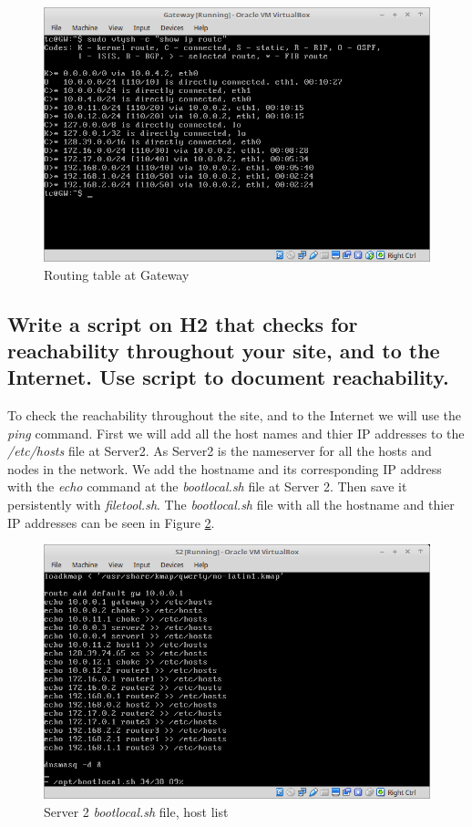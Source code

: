 \documentclass{article}
\begin{document}
\begin{figure}[!h]
    \centering
    \includegraphics[scale=0.3]{gateway-vytsh-route}
    \caption{Routing table at Gateway}
    \label{fig:GW-routes}
\end{figure}



\subsection{Write a script on H2 that checks for reachability throughout your site, and to the Internet. Use script to document reachability.}

To check the reachability throughout the site, and to the Internet we will use the \textit{ping} command. First we will add all the host names and thier IP addresses to the \textit{/etc/hosts} file at Server2. As Server2 is the nameserver for all the hosts and nodes in the network. 
We add the hostname and its corresponding IP address with the \textit{echo} command at the \textit{bootlocal.sh} file at Server 2. Then save it persistently with \textit{filetool.sh}. The \textit{bootlocal.sh} file with all the hostname and thier IP addresses can be seen in Figure \ref{fig:server2-lst}. 

\begin{figure}[!h]
    \centering
    \includegraphics[scale=0.3]{server2-host-list}
    \caption{Server 2 \textit{bootlocal.sh} file, host list}
    \label{fig:server2-lst}
\end{figure}
\end{document}
